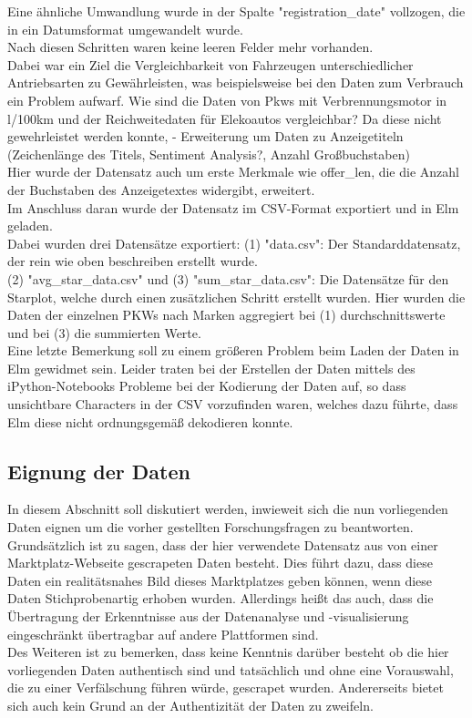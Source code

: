 \documentclass[usegeometry=true]{scrartcl}
\begin{document}
Eine ähnliche Umwandlung wurde in der Spalte "registration_date" vollzogen, die in ein Datumsformat umgewandelt wurde.\\
Nach diesen Schritten waren keine leeren Felder mehr vorhanden. \\
Dabei war ein Ziel die Vergleichbarkeit von Fahrzeugen unterschiedlicher Antriebsarten zu Gewährleisten, was beispielsweise bei den Daten zum Verbrauch ein Problem aufwarf. Wie sind die Daten von Pkws mit Verbrennungsmotor in l/100km und der Reichweitedaten für Elekoautos vergleichbar? Da diese nicht gewehrleistet werden konnte, 
- Erweiterung um Daten zu Anzeigetiteln (Zeichenlänge des Titels, Sentiment Analysis?, Anzahl Großbuchstaben) \\

Hier wurde der Datensatz auch um erste Merkmale wie offer_len, die die Anzahl der Buchstaben des Anzeigetextes widergibt, erweitert. \\

Im Anschluss daran wurde der Datensatz im CSV-Format exportiert und in Elm geladen. \\
Dabei wurden drei Datensätze exportiert: (1) "data.csv": Der Standarddatensatz, der rein wie oben beschreiben erstellt wurde. \\
(2) "avg_star_data.csv" und (3) "sum_star_data.csv": Die Datensätze für den Starplot, welche durch einen zusätzlichen Schritt erstellt wurden. Hier wurden die Daten der einzelnen PKWs nach Marken aggregiert bei (1) durchschnittswerte und bei (3) die summierten Werte.\\
Eine letzte Bemerkung soll zu einem größeren Problem beim Laden der Daten in Elm gewidmet sein. Leider traten bei der Erstellen der Daten mittels des iPython-Notebooks Probleme bei der Kodierung der Daten auf, so dass unsichtbare Characters in der CSV vorzufinden waren, welches dazu führte, dass Elm diese nicht ordnungsgemäß dekodieren konnte. \\

\subsection{Eignung der Daten}

In diesem Abschnitt soll diskutiert werden, inwieweit sich die nun vorliegenden Daten eignen um die vorher gestellten Forschungsfragen zu beantworten. \\
Grundsätzlich ist zu sagen, dass der hier verwendete Datensatz aus von einer Marktplatz-Webseite gescrapeten Daten besteht. Dies führt dazu, dass diese Daten ein realitätsnahes Bild dieses Marktplatzes geben können, wenn diese Daten Stichprobenartig erhoben wurden. Allerdings heißt das auch, dass die Übertragung der Erkenntnisse aus der Datenanalyse und -visualisierung eingeschränkt übertragbar auf andere Plattformen sind. \\
Des Weiteren ist zu bemerken, dass keine Kenntnis darüber besteht ob die hier vorliegenden Daten authentisch sind und tatsächlich und ohne eine Vorauswahl, die zu einer Verfälschung führen würde, gescrapet wurden. Andererseits bietet sich auch kein Grund an der Authentizität der Daten zu zweifeln. \\
\end{document}

